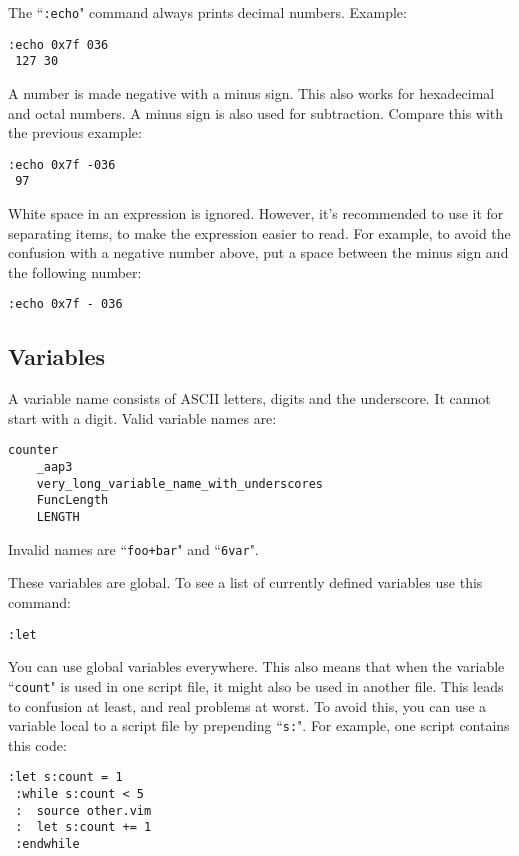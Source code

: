 The ``\texttt{:echo}" command always prints decimal numbers.
Example:

\begin{Verbatim}[samepage=true]
 :echo 0x7f 036
 127 30
\end{Verbatim}

A number is made negative with a minus sign.
This also works for hexadecimal and octal numbers.
A minus sign is also used for subtraction.
Compare this with the previous example:

\begin{Verbatim}[samepage=true]
 :echo 0x7f -036
 97
\end{Verbatim}

White space in an expression is ignored.
However, it's recommended to use it for separating items, to make the expression easier to read.
For example, to avoid the confusion with a negative number above, put a space between the minus sign and the following number:

\begin{Verbatim}[samepage=true]
 :echo 0x7f - 036
\end{Verbatim}
\subsection{Variables}
A variable name consists of ASCII letters, digits and the underscore.
It cannot start with a digit.
Valid variable names are:

\begin{Verbatim}[samepage=true]
    counter
    _aap3
    very_long_variable_name_with_underscores
    FuncLength
    LENGTH
\end{Verbatim}

Invalid names are ``\texttt{foo+bar}" and ``\texttt{6var}".

These variables are global.
To see a list of currently defined variables use this command:

\begin{Verbatim}[samepage=true]
 :let
\end{Verbatim}

You can use global variables everywhere.
This also means that when the variable ``\texttt{count}" is used in one script file, it might also be used in another file.
This leads to confusion at least, and real problems at worst.
To avoid this, you can use a variable local to a script file by prepending ``\texttt{s:}".
For example, one script contains this code:

\begin{Verbatim}[samepage=true]
 :let s:count = 1
 :while s:count < 5
 :  source other.vim
 :  let s:count += 1
 :endwhile
\end{Verbatim}

